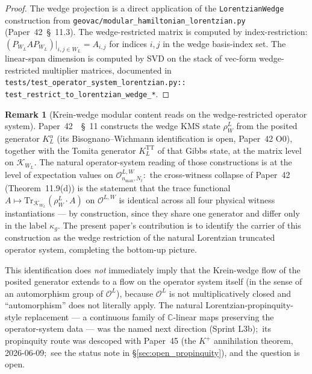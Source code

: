 \documentclass[11pt,a4paper]{article}
\theoremstyle{plain}
\theoremstyle{definition}
\newtheorem{remark}[theorem]{Remark}
\newcommand{\nmax}{n_{\max}}
\newcommand{\Nt}{N_t}
\newcommand{\Krein}{\mathcal{K}}
\newcommand{\Op}{\mathcal{O}}
\newcommand{\C}{\mathbb{C}}
\newcommand{\Tr}{\mathrm{Tr}}
\newcommand{\TT}{\mathrm{TT}}
\begin{document}
\begin{proof}
The wedge projection is a direct application of the
\texttt{LorentzianWedge} construction from
\texttt{geovac/modular\_hamiltonian\_lorentzian.py} (Paper~42~\S~11.3).
The wedge-restricted matrix is computed by index-restriction:
$(P_{W_L} A P_{W_L})|_{i, j \in W_L} = A_{i, j}$ for indices $i, j$
in the wedge basis-index set. The linear-span dimension is computed by
SVD on the stack of vec-form wedge-restricted multiplier matrices,
documented in
\texttt{tests/test\_operator\_system\_lorentzian.py::%
test\_restrict\_to\_lorentzian\_wedge\_*}.
\end{proof}

\begin{remark}[Krein-wedge modular content reads on the wedge-restricted
operator system]
\label{rem:wedge_paper43}
Paper~42~\cite{paper42}~\S~11 constructs the wedge KMS state $\rho_W^L$
from the posited generator $K_L^\alpha$ (its Bisognano--Wichmann
identification is open, Paper~42 O0), together with the Tomita
generator $K_L^{\TT}$ of that Gibbs state, at the
matrix level on $\Krein_{W_L}$. The natural operator-system reading
of those constructions is at the level of expectation values on
$\Op^{L, W}_{\nmax, \Nt}$:\ the cross-witness collapse of
Paper~42 (Theorem~11.9(d)) is the statement that the trace functional
$A \mapsto \Tr_{\Krein_{W_L}}(\rho_W^L \cdot A)$ on $\Op^{L, W}$ is
identical across all four physical witness instantiations --- by
construction, since they share one generator and differ only in the
label $\kappa_g$. The
present paper's contribution is to identify the carrier of this
construction as the wedge restriction of the natural Lorentzian
truncated operator system, completing the bottom-up picture.

This identification does \emph{not} immediately imply that the
Krein-wedge flow of the posited generator extends to a flow on the operator system
itself (in the sense of an automorphism group of $\Op^L$), because
$\Op^L$ is not multiplicatively closed and ``automorphism'' does not
literally apply. The natural Lorentzian-propinquity-style replacement
— a continuous family of $\C$-linear maps preserving the
operator-system data — was the named next direction (Sprint L3b);\
its propinquity route was descoped with Paper~45 (the $K^+$ annihilation
theorem, 2026-06-09;\ see the status note in
\S\ref{sec:open_propinquity}), and the question is open.
\end{remark}

\end{document}

